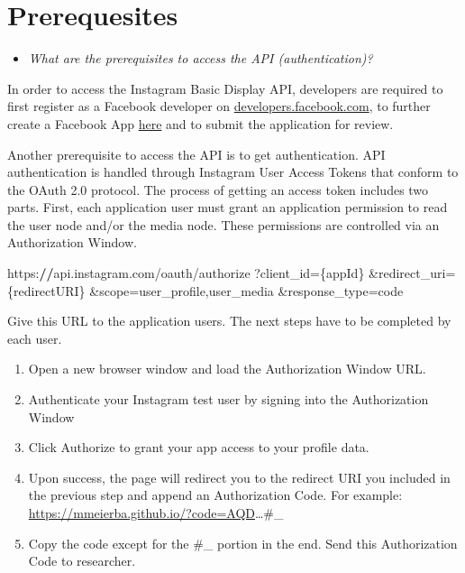 \documentclass[
]{book}
\newenvironment{Shaded}{\begin{snugshade}}{\end{snugshade}}
\newcommand{\ErrorTok}[1]{\textcolor[rgb]{0.64,0.00,0.00}{\textbf{#1}}}
\newcommand{\NormalTok}[1]{#1}
\newcommand{\OtherTok}[1]{\textcolor[rgb]{0.56,0.35,0.01}{#1}}
\newcommand{\SpecialCharTok}[1]{\textcolor[rgb]{0.00,0.00,0.00}{#1}}
\providecommand{\tightlist}{%
  \setlength{\itemsep}{0pt}\setlength{\parskip}{0pt}}
\begin{document}
\hypertarget{prerequesites-6}{%
\section{Prerequesites}\label{prerequesites-6}}

\begin{itemize}
\tightlist
\item
  \emph{What are the prerequisites to access the API (authentication)? }
\end{itemize}

In order to access the Instagram Basic Display API, developers are required to first register as a Facebook developer on \href{\%22https://developers.facebook.com/}{developers.facebook.com}, to further create a Facebook App \href{\%22https://developers.facebook.com/docs/instagram-basic-display-api/getting-started\%22}{here} and to submit the application for review.

Another prerequisite to access the API is to get authentication. API authentication is handled through Instagram User Access Tokens that conform to the OAuth 2.0 protocol. The process of getting an access token includes two parts. First, each application user must grant an application permission to read the user node and/or the media node. These permissions are controlled via an Authorization Window.

\begin{Shaded}
\begin{Highlighting}[]
\NormalTok{https}\SpecialCharTok{:}\ErrorTok{//}\NormalTok{api.instagram.com}\SpecialCharTok{/}\NormalTok{oauth}\SpecialCharTok{/}\NormalTok{authorize}
\NormalTok{  ?client\_id}\OtherTok{=}\NormalTok{\{appId\}}
  \SpecialCharTok{\&}\NormalTok{redirect\_uri}\OtherTok{=}\NormalTok{\{redirectURI\}}
  \SpecialCharTok{\&}\NormalTok{scope}\OtherTok{=}\NormalTok{user\_profile,user\_media}
  \SpecialCharTok{\&}\NormalTok{response\_type}\OtherTok{=}\NormalTok{code}
\end{Highlighting}
\end{Shaded}

Give this URL to the application users. The next steps have to be completed by each user.

\begin{enumerate}
\def\labelenumi{\arabic{enumi}.}
\item
  Open a new browser window and load the Authorization Window URL.
\item
  Authenticate your Instagram test user by signing into the Authorization Window
\item
  Click Authorize to grant your app access to your profile data.
\item
  Upon success, the page will redirect you to the redirect URI you included in the previous step and append an Authorization Code. For example: \url{https://mmeierba.github.io/?code=AQD}\ldots\#\_
\item
  Copy the code except for the \#\_ portion in the end. Send this Authorization Code to researcher.
\end{enumerate}
\end{document}
